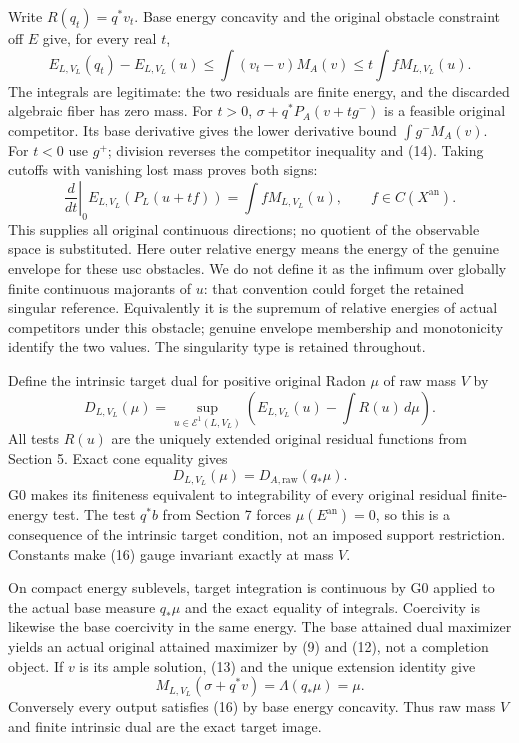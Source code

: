 \documentclass[
  10pt,
]{article}
\begin{document}
Write \(R(q_t)=q^*v_t\). Base energy concavity and the original obstacle
constraint off \(E\) give, for every real \(t\),
\[E_{L,V_L}(q_t)-E_{L,V_L}(u)
 \le\int(v_t-v)M_A(v)\le t\int fM_{L,V_L}(u).                        \tag{14}\]
The integrals are legitimate: the two residuals are finite energy, and
the discarded algebraic fiber has zero mass. For \(t>0\),
\(\sigma+q^*P_A(v+t g^-)\) is a feasible original competitor. Its base
derivative gives the lower derivative bound \(\int g^-M_A(v)\). For
\(t<0\) use \(g^+\); division reverses the competitor inequality and
(14). Taking cutoffs with vanishing lost mass proves both signs:
\[\left.\frac d{dt}\right|_{0}E_{L,V_L}(P_L(u+tf))
             =\int fM_{L,V_L}(u),\qquad f\in C(X^{\mathrm{an}}).       \tag{15}\]
This supplies all original continuous directions; no quotient of the
observable space is substituted. Here outer relative energy means the
energy of the genuine envelope for these usc obstacles. We do not define
it as the infimum over globally finite continuous majorants of \(u\):
that convention could forget the retained singular reference.
Equivalently it is the supremum of relative energies of actual
competitors under this obstacle; genuine envelope membership and
monotonicity identify the two values. The singularity type is retained
throughout.

Define the intrinsic target dual for positive original Radon \(\mu\) of
raw mass \(V\) by \[D_{L,V_L}(\mu)=\sup_{u\in\mathcal E^1(L,V_L)}
  \left(E_{L,V_L}(u)-\int R(u)\,d\mu\right).                         \tag{16}\]
All tests \(R(u)\) are the uniquely extended original residual functions
from Section 5. Exact cone equality gives
\[D_{L,V_L}(\mu)=D_{A,\mathrm{raw}}(q_*\mu).\] G0 makes its finiteness
equivalent to integrability of every original residual finite-energy
test. The test \(q^*b\) from Section 7 forces
\(\mu(E^{\mathrm{an}})=0\), so this is a consequence of the intrinsic
target condition, not an imposed support restriction. Constants make
(16) gauge invariant exactly at mass \(V\).

On compact energy sublevels, target integration is continuous by G0
applied to the actual base measure \(q_*\mu\) and the exact equality of
integrals. Coercivity is likewise the base coercivity in the same
energy. The base attained dual maximizer yields an actual original
attained maximizer by (9) and (12), not a completion object. If \(v\) is
its ample solution, (13) and the unique extension identity give
\[M_{L,V_L}(\sigma+q^*v)=\Lambda(q_*\mu)=\mu.\] Conversely every output
satisfies (16) by base energy concavity. Thus raw mass \(V\) and finite
intrinsic dual are the exact target image.
\end{document}
